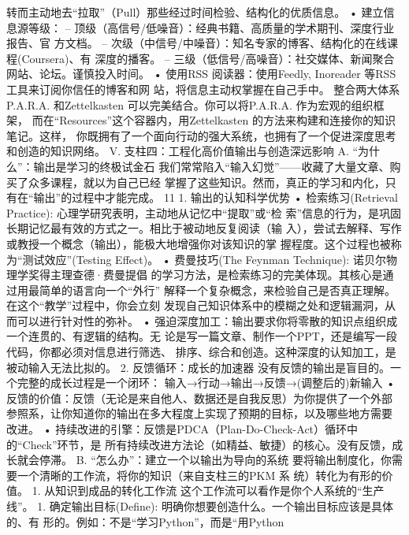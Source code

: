 \documentclass[a4paper,12pt]{article}
\begin{document}
\begin{multicols}{2}
    转而主动地去``拉取''（Pull）那些经过时间检验、结构化的优质信息。 •
    建立信息源等级： --
    顶级（高信号/低噪音）：经典书籍、高质量的学术期刊、深度行业报告、官
    方文档。 --
    次级（中信号/中噪音）：知名专家的博客、结构化的在线课程(Coursera)、有
    深度的播客。 --
    三级（低信号/高噪音）：社交媒体、新闻聚合网站、论坛。谨慎投入时间。
    • 使用RSS 阅读器：使用Feedly, Inoreader 等RSS
    工具来订阅你信任的博客和网 站，将信息主动权掌握在自己手中。
    整合两大体系 P.A.R.A. 和Zettelkasten 可以完美结合。你可以将P.A.R.A.
    作为宏观的组织框架， 而在``Resources''这个容器内，用Zettelkasten
    的方法来构建和连接你的知识笔记。这样，
    你既拥有了一个面向行动的强大系统，也拥有了一个促进深度思考和创造的知识网络。
    V. 支柱四：工程化高价值输出与创造深远影响 A.
    ``为什么''：输出是学习的终极试金石
    我们常常陷入``输入幻觉''------收藏了大量文章、购买了众多课程，就以为自己已经
    掌握了这些知识。然而，真正的学习和内化，只有在``输出''的过程中才能完成。
    11 1. 输出的认知科学优势 • 检索练习(Retrieval Practice):
    心理学研究表明，主动地从记忆中``提取''或``检
    索''信息的行为，是巩固长期记忆最有效的方式之一。相比于被动地反复阅读（输
    入），尝试去解释、写作或教授一个概念（输出），能极大地增强你对该知识的掌
    握程度。这个过程也被称为``测试效应''(Testing Effect)。 •
    费曼技巧(The Feynman Technique): 诺贝尔物理学奖得主理查德·费曼提倡
    的学习方法，是检索练习的完美体现。其核心是通过用最简单的语言向一个``外行''
    解释一个复杂概念，来检验自己是否真正理解。在这个``教学''过程中，你会立刻
    发现自己知识体系中的模糊之处和逻辑漏洞，从而可以进行针对性的弥补。 •
    强迫深度加工：输出要求你将零散的知识点组织成一个连贯的、有逻辑的结构。无
    论是写一篇文章、制作一个PPT，还是编写一段代码，你都必须对信息进行筛选、
    排序、综合和创造。这种深度的认知加工，是被动输入无法比拟的。 2.
    反馈循环：成长的加速器
    没有反馈的输出是盲目的。一个完整的成长过程是一个闭环：
    输入→行动→输出→反馈→(调整后的)新输入 •
    反馈的价值：反馈（无论是来自他人、数据还是自我反思）为你提供了一个外部
    参照系，让你知道你的输出在多大程度上实现了预期的目标，以及哪些地方需要
    改进。 •
    持续改进的引擎：反馈是PDCA（Plan-Do-Check-Act）循环中的``Check''环节，是
    所有持续改进方法论（如精益、敏捷）的核心。没有反馈，成长就会停滞。
    B. ``怎么办''：建立一个以输出为导向的系统
    要将输出制度化，你需要一个清晰的工作流，将你的知识（来自支柱三的PKM
    系 统）转化为有形的价值。 1. 从知识到成品的转化工作流
    这个工作流可以看作是你个人系统的``生产线''。 1.
    确定输出目标(Define):
    明确你想要创造什么。一个输出目标应该是具体的、有
    形的。例如：不是``学习Python''，而是``用Python

\end{multicols}
\end{document}
